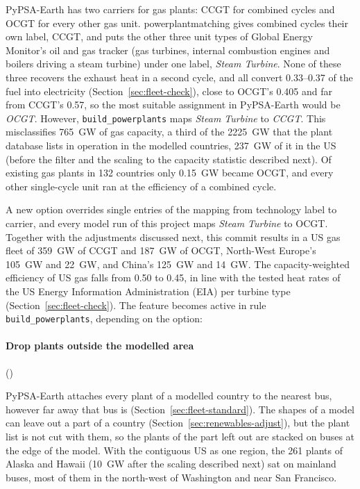 PyPSA-Earth has two carriers for gas plants: CCGT for combined cycles and OCGT for every other gas unit.
powerplantmatching gives combined cycles their own label, CCGT, and puts the other three unit types of Global Energy Monitor's oil and gas tracker (gas turbines, internal combustion engines and boilers driving a steam turbine) under one label, \emph{Steam Turbine}.
None of these three recovers the exhaust heat in a second cycle, and all convert 0.33--0.37 of the fuel into electricity (Section~\ref{sec:fleet-check}), close to OCGT's 0.405 and far from CCGT's 0.57, so the most suitable assignment in PyPSA-Earth would be \textit{OCGT}.
However, \texttt{build\_powerplants} maps \emph{Steam Turbine} to \textit{CCGT}.
This misclassifies \SI{765}{GW} of gas capacity, a third of the \SI{2225}{GW} that the plant database lists in operation in the modelled countries, \SI{237}{GW} of it in the US (before the filter and the scaling to the capacity statistic described next).
Of existing gas plants in 132 countries only \SI{0.15}{GW} became OCGT, and every other single-cycle unit ran at the efficiency of a combined cycle.

A new option overrides single entries of the mapping from technology label to carrier, and every model run of this project maps \emph{Steam Turbine} to OCGT.
Together with the adjustments discussed next, this commit results in a US gas fleet of \SI{359}{GW} of CCGT and \SI{187}{GW} of OCGT, North-West Europe's \SI{105}{GW} and \SI{22}{GW}, and China's \SI{125}{GW} and \SI{14}{GW}.
The capacity-weighted efficiency of US gas falls from 0.50 to 0.45, in line with the tested heat rates of the US Energy Information Administration (EIA) per turbine type \citep{eiaepa} (Section~\ref{sec:fleet-check}).
The feature becomes active in rule \texttt{build\_powerplants}, depending on the option:

\paragraph{Drop plants outside the modelled area} ()

PyPSA-Earth attaches every plant of a modelled country to the nearest bus, however far away that bus is (Section~\ref{sec:fleet-standard}).
The shapes of a model can leave out a part of a country (Section~\ref{sec:renewables-adjust}), but the plant list is not cut with them, so the plants of the part left out are stacked on buses at the edge of the model.
With the contiguous US as one region, the 261 plants of Alaska and Hawaii (\SI{10}{GW} after the scaling described next) sat on mainland buses, most of them in the north-west of Washington and near San Francisco.

